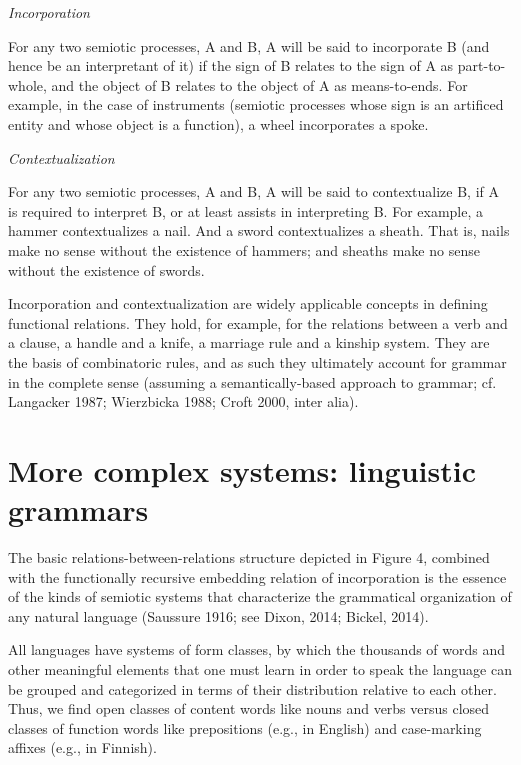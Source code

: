\textit{Incorporation}

For any two semiotic processes, A and B, A will be said to incorporate B 
(and hence be an interpretant of it) if the sign of B relates to the 
sign of A as part-to-whole, and the object of B relates to the object of 
A as means-to-ends. For example, in the case of instruments (semiotic 
processes whose sign is an artificed entity and whose object is a 
function), a wheel incorporates a spoke.



\textit{Contextualization}

For any two semiotic processes, A and B, A will be said to contextualize 
B, if A is required to interpret B, or at least assists in interpreting 
B. For example, a hammer contextualizes a nail. And a sword 
contextualizes a sheath. That is, nails make no sense without the 
existence of hammers; and sheaths make no sense without the existence of 
swords.



Incorporation and contextualization are widely applicable concepts in 
defining functional relations. They hold, for example, for the relations 
between a verb and a clause, a handle and a knife, a marriage rule and a 
kinship system. They are the basis of combinatoric rules, and as such 
they ultimately account for grammar in the complete sense (assuming a 
semantically-based approach to grammar; cf. Langacker 1987; Wierzbicka 
1988; Croft 2000, inter alia). 



\section{More complex systems: linguistic grammars}


The basic relations-between-relations structure depicted in Figure 4, 
combined with the functionally recursive embedding relation of 
incorporation is the essence of the kinds of semiotic systems that 
characterize the grammatical organization of any natural language 
(Saussure 1916; see Dixon, 2014; Bickel, 2014). 



All languages have systems of form classes, by which the thousands of 
words and other meaningful elements that one must learn in order to 
speak the language can be grouped and categorized in terms of their 
distribution relative to each other. Thus, we find open classes of 
content words like nouns and verbs versus closed classes of function 
words like prepositions (e.g., in English) and case-marking affixes 
(e.g., in Finnish). 



